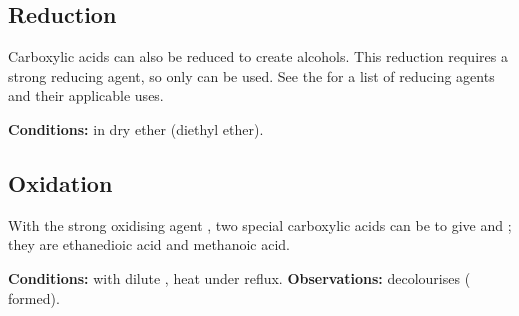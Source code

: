 

		\pagebreak
		\subsection{Reduction}

			Carboxylic acids can also be reduced to create alcohols. This reduction requires a strong reducing agent, so only
			 can be used. See the \hyperlink{AppendixReducingAgents}{} for a list of reducing agents
			and their applicable uses.

			\vspace{1.5em}
			\vbox{\textbf{Conditions:}\tabto{35mm} in dry ether (diethyl ether).}




		\subsection{Oxidation}

			With the strong oxidising agent , two special carboxylic acids can be  to give 
			and ; they are ethanedioic acid and methanoic acid.


			\vspace{1.5em}
			\vbox{\textbf{Conditions:}	\tabto{35mm} with dilute ,
										\tabto{35mm}heat under reflux.}
			\vspace{0.75em}
			\vbox{\textbf{Observations:}\tabto{35mm}  decolourises ( formed).}
















